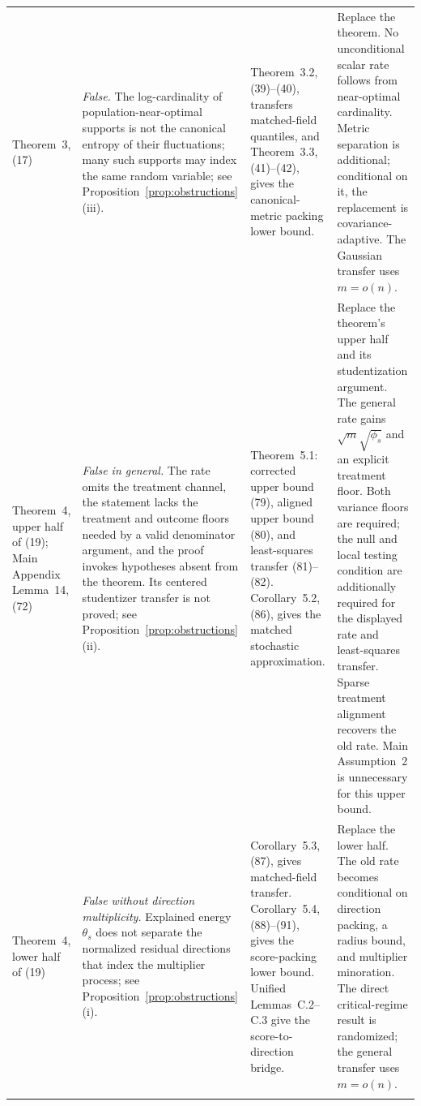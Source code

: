 \documentclass[a4paper,10pt,english]{article}
\theoremstyle{definition}
\begin{document}
\begin{longtable}{@{}>{\raggedright\arraybackslash}p{}
>{\raggedright\arraybackslash}p{}
>{\raggedright\arraybackslash}p{}
>{\raggedright\arraybackslash}p{}@{}}
Theorem~3, (17) &
\emph{False.}  The log-cardinality of population-near-optimal supports
is not the canonical entropy of their fluctuations; many such supports
may index the same random variable; see
Proposition~\ref{prop:obstructions}(iii). &
Theorem~3.2, (39)--(40), transfers matched-field quantiles, and
Theorem~3.3, (41)--(42), gives the canonical-metric packing lower bound. &
Replace the theorem.  No unconditional scalar rate follows from
near-optimal cardinality.  Metric separation is additional; conditional
on it, the replacement is covariance-adaptive.  The Gaussian transfer
uses $m=o(n)$. \\
\addlinespace

Theorem~4, upper half of (19); Main Appendix Lemma~14, (72) &
\emph{False in general.}  The rate omits the treatment channel, the
statement lacks the treatment and outcome floors needed by a valid
denominator argument, and the proof invokes hypotheses absent from the theorem.
Its centered studentizer transfer is not proved; see
Proposition~\ref{prop:obstructions}(ii). &
Theorem~5.1: corrected upper bound (79), aligned upper bound (80), and
least-squares transfer (81)--(82).  Corollary~5.2, (86), gives the
matched stochastic approximation. &
Replace the theorem's upper half and its studentization argument.  The
general rate gains $\sqrt m\sqrt{\phi_s}$ and an explicit treatment
floor.  Both variance floors are required; the null and local testing
condition are additionally required for the displayed rate and
least-squares transfer.  Sparse treatment alignment recovers the old
rate.  Main Assumption~2 is unnecessary for this upper bound. \\
\addlinespace

Theorem~4, lower half of (19) &
\emph{False without direction multiplicity.}  Explained energy
$\theta_s$ does not separate the normalized residual directions that
index the multiplier process; see
Proposition~\ref{prop:obstructions}(i). &
Corollary~5.3, (87), gives matched-field transfer.  Corollary~5.4,
(88)--(91), gives the score-packing lower bound.  Unified
Lemmas~C.2--C.3 give the score-to-direction bridge. &
Replace the lower half.  The old rate becomes conditional on direction
packing, a radius bound, and multiplier minoration.  The direct
critical-regime result is randomized; the general transfer uses
$m=o(n)$. \\
\addlinespace


\end{longtable}
\end{document}
